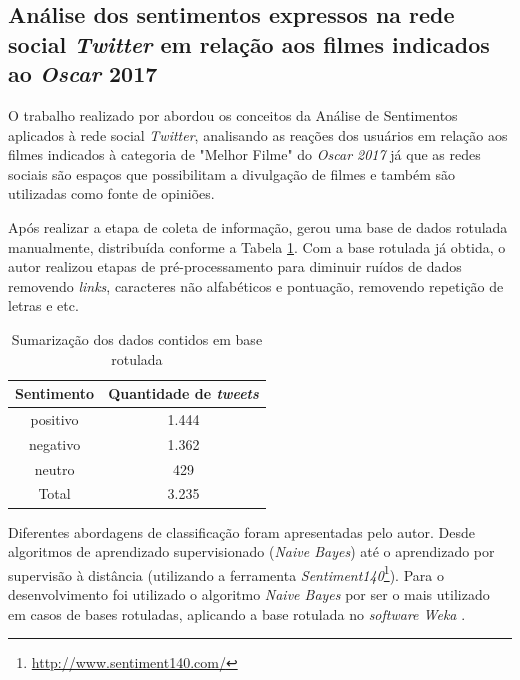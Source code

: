 \subsection{Análise dos sentimentos expressos na rede social \textit{Twitter} em relação aos filmes indicados ao \textit{Oscar} 2017}

O trabalho realizado por  abordou os conceitos da Análise de Sentimentos aplicados à rede social \textit{Twitter}, analisando as reações dos usuários em relação aos filmes indicados à categoria de "Melhor Filme" do \textit{Oscar 2017} já que as redes sociais são espaços que possibilitam a divulgação de filmes e também são utilizadas como fonte de opiniões. 

Após realizar a etapa de coleta de informação,  gerou uma base de dados rotulada manualmente, distribuída conforme a Tabela \ref{tab:sumarizacaocorrea}. Com a base rotulada já obtida, o autor realizou etapas de pré-processamento para diminuir ruídos de dados removendo \textit{links}, caracteres não alfabéticos e pontuação, removendo repetição de letras e etc.

\begin{table}[h!]
  \begin{center}
    \caption{Sumarização dos dados contidos em base rotulada}
    \label{tab:sumarizacaocorrea}
    
    \begin{tabular}{cc} %
      \textbf{Sentimento} & \textbf{Quantidade de \textit{tweets}}\\
      \hline
       positivo&1.444\\
       negativo&1.362\\
       neutro&429\\
      \hline
      Total&3.235
    \end{tabular}
  \end{center}
\end{table}


Diferentes abordagens de classificação foram apresentadas pelo autor. Desde algoritmos de aprendizado supervisionado (\textit{Naive Bayes}) até o aprendizado por supervisão à distância (utilizando a ferramenta \textit{Sentiment140}\footnote{\url{http://www.sentiment140.com/}}). Para o desenvolvimento foi utilizado o algoritmo \textit{Naive Bayes} por ser o mais utilizado em casos de bases rotuladas, aplicando a base rotulada no \textit{software Weka} \cite{Correa2017}. 

